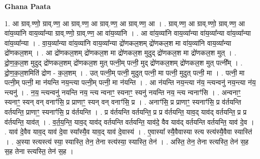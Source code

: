 \documentclass[17pt]{extarticle}
\begin{document}
\textbf{Ghana Paata } \newline

1. आ ग्राव्.ण्णो॒ ग्राव्.ण्ण॒ आ ग्राव्.ण्ण॒ आ ग्राव्.ण्ण॒ आ ग्राव्.ण्ण॒ आ । . ग्राव्.ण्ण॒ आ ग्राव्.ण्णो॒ ग्राव्.ण्ण॒ आ वा॑य॒व्या॑नि वाय॒व्या᳚न्या ग्राव्.ण्णो॒ ग्राव्.ण्ण॒ आ वा॑य॒व्या॑नि । . आ वा॑य॒व्या॑नि वाय॒व्या᳚न्या वा॑य॒व्या᳚न्या वा॑य॒व्या᳚न्या वा॑य॒व्या᳚न्या । . वा॒य॒व्या᳚न्या वा॑य॒व्या॑नि वाय॒व्या᳚न्या द्रो॑णकल॒शम् द्रो॑णकल॒श मा वा॑य॒व्या॑नि वाय॒व्या᳚न्या द्रो॑णकल॒शम् । . आ द्रो॑णकल॒शम् द्रो॑णकल॒श मा द्रो॑णकल॒श मुदुद् द्रो॑णकल॒श मा द्रो॑णकल॒श मुत् । . द्रो॒ण॒क॒ल॒श मुदुद् द्रो॑णकल॒शम् द्रो॑णकल॒श मुत् पत्नी॒म् पत्नी॒ मुद् द्रो॑णकल॒शम् द्रो॑णकल॒श मुत् पत्नी᳚म् । . द्रो॒ण॒क॒ल॒शमिति॑ द्रोण - क॒ल॒शम् । . उत् पत्नी॒म् पत्नी॒ मुदुत् पत्नी॒ मा पत्नी॒ मुदुत् पत्नी॒ मा । . पत्नी॒ मा पत्नी॒म् पत्नी॒ मा न॑यन्ति नय॒न्त्या पत्नी॒म् पत्नी॒ मा न॑यन्ति । . आ न॑यन्ति नय॒न्त्या न॑य॒ न्त्यन्वनु॑ नय॒न्त्या न॑य॒ न्त्यनु॑ । . न॒य॒ न्त्यन्वनु॑ नयन्ति नय॒ न्त्य न्वनाꣳ॒॒ स्यनाꣳ॒॒ स्यनु॑ नयन्ति नय॒ न्त्य न्वनाꣳ॑सि । . अन्वनाꣳ॒॒ स्यनाꣳ॒॒ स्यन् वन् वनाꣳ॑सि॒ प्र प्राणाꣳ॒॒ स्यन् वन् वनाꣳ॑सि॒ प्र । . अनाꣳ॑सि॒ प्र प्राणाꣳ॒॒ स्यनाꣳ॑सि॒ प्र व॑र्तयन्ति वर्तयन्ति॒ प्राणाꣳ॒॒ स्यनाꣳ॑सि॒ प्र व॑र्तयन्ति । . प्र व॑र्तयन्ति वर्तयन्ति॒ प्र प्र व॑र्तयन्ति॒ याव॒द् याव॑द् वर्तयन्ति॒ प्र प्र व॑र्तयन्ति॒ याव॑त् । . व॒र्त॒य॒न्ति॒ याव॒द् याव॑द् वर्तयन्ति वर्तयन्ति॒ याव॑दे॒ वैव याव॑द् वर्तयन्ति वर्तयन्ति॒ याव॑ दे॒व । . याव॑ दे॒वैव याव॒द् याव॑ दे॒वा स्या᳚स्यै॒व याव॒द् याव॑ दे॒वास्य॑ । . ए॒वास्या᳚ स्यै॒वैवास्या स्त्य स्त्य॑स्यै॒वैवा स्यास्ति॑ । . अ॒स्या स्त्यस्त्य॑ स्या॒ स्यास्ति॒ तेन॒ तेना स्त्य॑स्या॒ स्यास्ति॒ तेन॑ । . अस्ति॒ तेन॒ तेना स्त्यस्ति॒ तेन॑ स॒ह स॒ह तेना स्त्यस्ति॒ तेन॑ स॒ह । \newline
\end{document}
